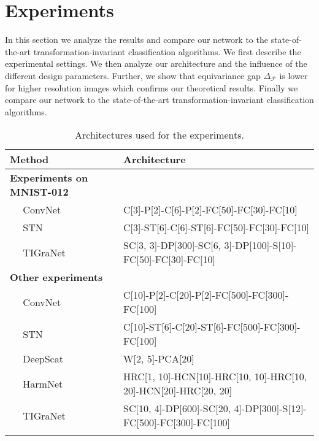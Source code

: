 \documentclass[10pt,journal,compsoc]{IEEEtran}
\newcommand{\mF}{\mathcal{F}}
\begin{document}
	\section{Experiments}
	\label{s:exp}
	
	In this section we analyze the results and compare our network to the state-of-the-art transformation-invariant classification algorithms. We first describe the experimental settings. We then analyze our architecture and the influence of the different design parameters. Further, we show that equivariance gap $\Delta_\mF$ is lower for higher resolution images which confirms our theoretical results. Finally we compare our network to the state-of-the-art transformation-invariant classification algorithms.
	
	\begin{table*}[!ht]
		\centering
		\begin{tabularx}{\linewidth}{Xl}
			\toprule
			Method & Architecture \\
			\midrule{\bf Experiments on MNIST-012} & \\
			$\quad$ ConvNet~\cite{bb:lecun} & C[3]-P[2]-C[6]-P[2]-FC[50]-FC[30]-FC[10] \\
			$\quad$ STN~\cite{bb:STN} & C[3]-ST[6]-C[6]-ST[6]-FC[50]-FC[30]-FC[10] \\
			$\quad$ TIGraNet & SC[3, 3]-DP[300]-SC[6, 3]-DP[100]-S[10]-FC[50]-FC[30]-FC[10] \\
			\midrule{\bf Other experiments} & \\
			$\quad$ ConvNet~\cite{bb:lecun} & C[10]-P[2]-C[20]-P[2]-FC[500]-FC[300]-FC[100] \\
			$\quad$ STN~\cite{bb:STN} & C[10]-ST[6]-C[20]-ST[6]-FC[500]-FC[300]-FC[100] \\
			$\quad$ DeepScat~\cite{bb:oyallon2015deep} & W[2, 5]-PCA[20] \\
			$\quad$ HarmNet~\cite{bb:harm}  & HRC[1, 10]-HCN[10]-HRC[10, 10]-HRC[10, 20]-HCN[20]-HRC[20, 20] \\
			$\quad$ TIGraNet & SC[10, 4]-DP[600]-SC[20, 4]-DP[300]-S[12]-FC[500]-FC[300]-FC[100] \\
			\bottomrule 
			\\
		\end{tabularx}
		\caption{Architectures used for the experiments. 
}
\end{table*}
\end{document}
